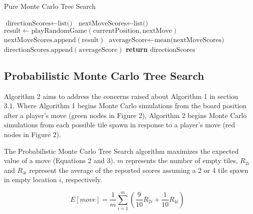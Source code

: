 \documentclass{article}
\begin{document}
\begin{algorithm}
    \caption{Pure Monte Carlo Tree Search}
    \begin{algorithmic}[1]
            \State $\text{directionScores} \gets \text{list()}$
                \State $\text{nextMoveScores} \gets \text{list()}$
                    \State $\text{result} \gets \text{playRandomGame}(\text{currentPosition}, \text{nextMove})$
                    \State $\text{nextMoveScores}.\text{append}(\text{result})$
                \EndFor
                \State $\text{averageScore} \gets \text{mean(nextMoveScores)}$
                \State $\text{directionScores}.\text{append}(\text{averageScore})$
            \EndFor
            \State \textbf{return} $\text{directionScores}$
        \EndFunction
    \end{algorithmic}
\end{algorithm}

\subsection{Probabilistic Monte Carlo Tree Search}
Algorithm 2 aims to address the concerns raised about Algorithm 1 in section 3.1.  Where Algorithm 1 begins Monte Carlo simulations from the board position after a player's move (green nodes in Figure 2), Algorithm 2 begins Monte Carlo simulations from each possible tile spawn in response to a player's move (red nodes in Figure 2).  

The Probabilistic Monte Carlo Tree Search algorithm maximizes the expected value of a move (Equations 2 and 3). $m$ represents the number of empty tiles, $R_{2i}$ and $R_{4i}$ represent the average of the reported scores assuming a 2 or 4 tile spawn in empty location $i$, respectively.

\begin{equation}
  \label{eq:expected_value}
  E[move] = \frac{1}{m}\sum_{i=1}^m \left(\frac{9}{10}R_{2i} + \frac{1}{10}R_{4i}\right)
\end{equation}
\end{document}
